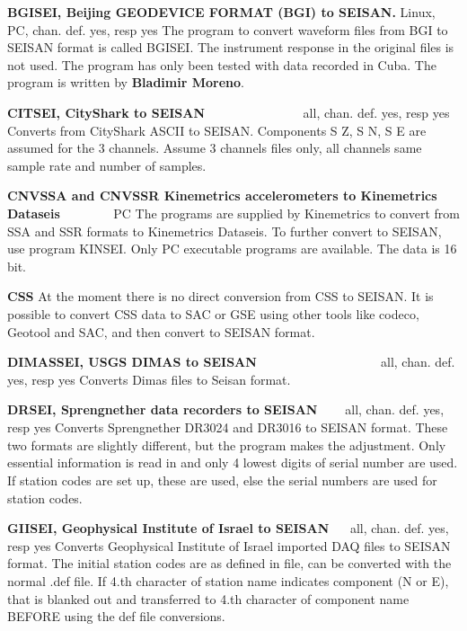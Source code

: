 \textbf{BGISEI, Beijing GEODEVICE FORMAT (BGI) to SEISAN.}
\verb|| Linux, PC, chan. def. yes, resp yes\newline
{}
The program to convert waveform files from BGI to SEISAN format is called BGISEI. The instrument response in the original files is not used. The program has only been tested with data recorded in Cuba. The program is written by \textbf{Bladimir Moreno}. 

\textbf{CITSEI, CityShark to SEISAN} \verb|              | all, chan. def. yes, resp yes \newline
Converts from CityShark ASCII to SEISAN. Components S Z, S N, S E are assumed for the 3 channels. Assume 3 channels files only, all channels same sample rate and number of samples. 

\textbf{CNVSSA and CNVSSR Kinemetrics accelerometers to Kinemetrics Dataseis} \verb|       | PC \newline
The programs are supplied by Kinemetrics to convert from SSA and SSR formats to Kinemetrics Dataseis. To further convert to SEISAN, use program KINSEI. Only PC executable programs are available. The data is 16 bit. 

\textbf{CSS} \newline
At the moment there is no direct conversion from CSS to SEISAN. It is possible to convert CSS data to SAC or GSE using other tools like codeco, Geotool and SAC, and then convert to SEISAN format.  

{
\textbf{DIMASSEI, USGS DIMAS to SEISAN} \verb|                  | all, chan. def. yes, resp yes\newline
{}
Converts Dimas files to Seisan format.
}

\textbf{DRSEI, Sprengnether data recorders to SEISAN} \verb|   | 
all, chan. def. yes, resp yes \newline
{}
Converts Sprengnether DR3024 and DR3016 to SEISAN format. These two formats are slightly different, but the program makes the adjustment. Only essential information is read in and only 4 lowest digits of serial number are used. If station codes are set up, these are used, else the serial numbers are used for station codes. 

\textbf{GIISEI, Geophysical Institute of Israel to SEISAN}
\verb|  | all, chan. def. yes, resp yes\newline
{}
Converts Geophysical Institute of Israel imported DAQ files to SEISAN format. The initial station codes are as defined in file, can be converted with the normal .def file. If 4.th character of station name indicates component (N or E), that is blanked out and transferred to 4.th character of component name BEFORE using the def file conversions. 

